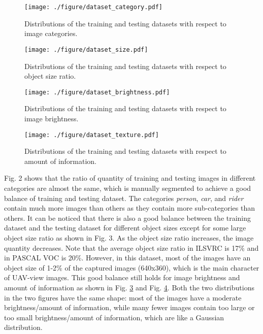 \documentclass[10pt,journal,compsoc]{IEEEtran}
\begin{document}
\begin{figure}
\centering
  \texttt{[image: ./figure/dataset\_category.pdf]}
  \vspace{-25pt}
  \caption{Distributions of the training and testing datasets with respect to image categories.}
  \vspace{-5pt}
  \label{fig:dataset_category}
\end{figure}

\begin{figure}
\centering
  \texttt{[image: ./figure/dataset\_size.pdf]}
  \vspace{-25pt}
  \caption{Distributions of the training and testing datasets with respect to object size ratio.}
  \vspace{-5pt}
  \label{fig:dataset_size}
\end{figure}


\begin{figure}
\centering
  \texttt{[image: ./figure/dataset\_brightness.pdf]}
  \vspace{-25pt}
  \caption{Distributions of the training and testing datasets with respect to image brightness.}
  \vspace{-5pt}
  \label{fig:dataset_brightness}
\end{figure}


\begin{figure}
\centering
  \texttt{[image: ./figure/dataset\_texture.pdf]}
  \vspace{-25pt}
  \caption{Distributions of the training and testing datasets with respect to amount of information.}
  \label{fig:dataset_texture}
\end{figure}


Fig. 2 shows that the ratio of quantity of training and testing images in different categories are almost the same, which is manually segmented to achieve a good balance of training and testing dataset.
The categories \textit{person}, \textit{car}, and \textit{rider} contain much more images than others as they contain more sub-categories than others.
It can be noticed that there is also a good balance between the training dataset and the testing dataset for different object sizes except for some large object size ratio as shown in Fig. 3.
As the object size ratio increases, the image quantity decreases.
Note that the average object size ratio in ILSVRC is 17\% and in PASCAL VOC is 20\%.
However, in this dataset, most of the images have an object size of 1-2\% of the captured images (640x360), which is the main character of UAV-view images.
This good balance still holds for image brightness and amount of information as shown in Fig. \ref{fig:dataset_brightness} and Fig. \ref{fig:dataset_texture}.
Both the two distributions in the two figures have the same shape: most of the images have a moderate brightness/amount of information, while many fewer images contain too large or too small brightness/amount of information, which are like a Gaussian distribution.
\end{document}
